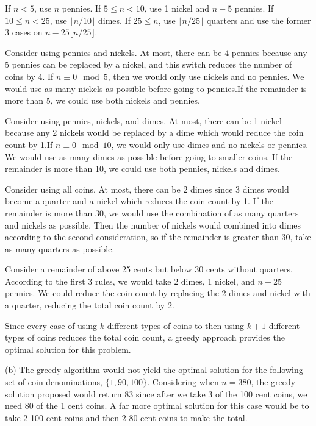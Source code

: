 \documentclass[12pt]{article}
\begin{document}
	
	If $n<5$, use $n$ pennies. If $5\leq n<10$, use 1 nickel and $n-5$ pennies. If $10\leq n<25$, use $ \lfloor n/10 \rfloor$ dimes. If $25\leq n$, use $ \lfloor n/25 \rfloor$ quarters and use the former 3 cases on $n-25\lfloor n/25 \rfloor$.

	Consider using pennies and nickels. At most, there can be 4 pennies because any 5 pennies can be replaced by a nickel, and this switch reduces the number of coins by 4. If $n \equiv 0\mod 5$, then we would only use nickels and no pennies. We would use as many nickels as possible before going to pennies.If the remainder is more than 5, we could use both nickels and pennies.
	
	Consider using pennies, nickels, and dimes. At most, there can be 1 nickel because any 2 nickels would be replaced by a dime which would reduce the coin count by 1.If $n \equiv 0\mod 10$, we would only use dimes and no nickels or pennies. We would use as many dimes as possible before going to smaller coins. If the remainder is more than 10, we could use both pennies, nickels and dimes.

	Consider using all coins. At most, there can be 2 dimes since 3 dimes would become a quarter and a nickel which reduces the coin count by 1. If the remainder is more than 30, we would use the combination of as many quarters and nickels as possible. Then the number of nickels would combined into dimes according to the second consideration, so if the remainder is greater than 30, take as many quarters as possible.

	Consider a remainder of above 25 cents but below 30 cents without quarters. According to the first 3 rules, we would take 2 dimes, 1 nickel, and $n-25$ pennies. We could reduce the coin count by replacing the 2 dimes and nickel with a quarter, reducing the total coin count by 2.

	Since every case of using $k$ different types of coins to then using $k+1$ different types of coins reduces the total coin count, a greedy approach provides the optimal solution for this problem.
	
	(b) The greedy algorithm would not yield the optimal solution for the following set of coin denominations, $\{1, 90, 100\}$. Considering when $n=380$, the greedy solution proposed would return 83 since after we take 3 of the 100 cent coins, we need 80 of the 1 cent coins. A far more optimal solution for this case would be to take 2 100 cent coins and then 2 80 cent coins to make the total.
\end{document}
